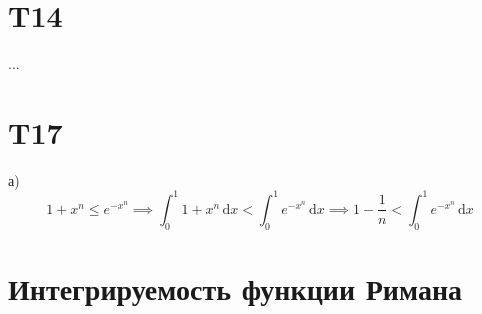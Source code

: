 \documentclass[12pt]{article}
\begin{document}
\section{T14}
...
\section{T17}
а) 
\[
    1 + x^n \leq e^{-x^n} \implies \int_{0}^{1} 1 + x^n \,\mathrm{d}x  < \int_{0}^{1} e^{-x^n} \,\mathrm{d}x  \implies 1 - \frac{1}{n} < \int_{0}^{1} e^{-x^n} \,\mathrm{d}x
\]
\section{Интегрируемость функции Римана}
\end{document}
